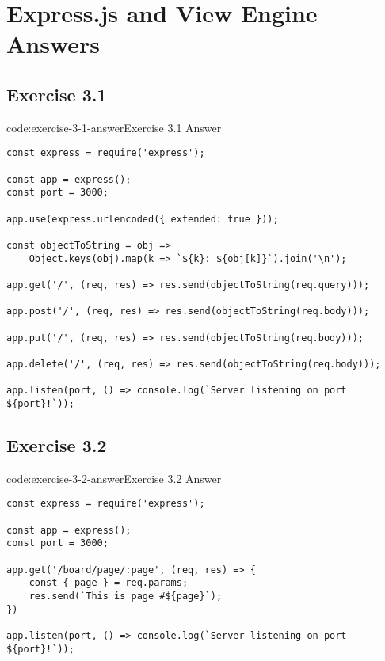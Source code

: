 \section{Express.js and View Engine Answers}\label{sect:express-js-and-view-engine-answers}

\subsection*{Exercise 3.1}

\begin{codeenv}{code:exercise-3-1-answer}{Exercise 3.1 Answer}\begin{verbatim}
const express = require('express');

const app = express();
const port = 3000;

app.use(express.urlencoded({ extended: true }));

const objectToString = obj =>
    Object.keys(obj).map(k => `${k}: ${obj[k]}`).join('\n');

app.get('/', (req, res) => res.send(objectToString(req.query)));

app.post('/', (req, res) => res.send(objectToString(req.body)));

app.put('/', (req, res) => res.send(objectToString(req.body)));

app.delete('/', (req, res) => res.send(objectToString(req.body)));

app.listen(port, () => console.log(`Server listening on port ${port}!`));
\end{verbatim}
\end{codeenv}

\subsection*{Exercise 3.2}

\begin{codeenv}{code:exercise-3-2-answer}{Exercise 3.2 Answer}\begin{verbatim}
const express = require('express');

const app = express();
const port = 3000;

app.get('/board/page/:page', (req, res) => {
    const { page } = req.params;
    res.send(`This is page #${page}`);
})

app.listen(port, () => console.log(`Server listening on port ${port}!`));
\end{verbatim}
\end{codeenv}
\newpage

